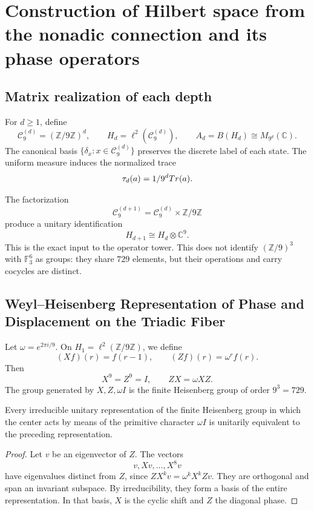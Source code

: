 \label{chap:83-21}



\section{Construction of Hilbert space from the nonadic connection and its phase operators}

\subsection{Matrix realization of each depth}

For \(d\ge1\), define
\[
  \mathcal C_9^{(d)}=(\mathbb Z/9\mathbb Z)^d,
  \qquad
  H_d=\ell^2(\mathcal C_9^{(d)}),
  \qquad
  A_d=B(H_d)\cong M_{9^d}(\mathbb C).
\]
The canonical basis \(\{\delta_x:x\in\mathcal C_9^{(d)}\}\) preserves the
discrete label of each state. The uniform measure induces the normalized
trace
\[
  \tau_d(a)=1/9^dTr(a).
\]

The factorization
\[
  \mathcal C_9^{(d+1)}
  =
  \mathcal C_9^{(d)}\times\mathbb Z/9\mathbb Z
\]
produce a unitary identification
\[
  H_{d+1}\cong H_d\otimes\mathbb C^9.
\]
This is the exact input to the operator tower. This does not identify
\((\mathbb Z/9)^3\) with \(\mathbb F_3^6\) as groups: they share \(729\)
elements, but their operations and carry cocycles are distinct.

\subsection{Weyl–Heisenberg Representation of Phase and Displacement on the Triadic Fiber}

Let \(\omega=e^{2\pi i/9}\). On
\(H_1=\ell^2(\mathbb Z/9\mathbb Z)\), we define
\[
  (Xf)(r)=f(r-1),
  \qquad
  (Zf)(r)=\omega^r f(r).
\]
Then
\[
  X^9=Z^9=I,
  \qquad
  ZX=\omega XZ.
\]
The group generated by \(X,Z,\omega I\) is the finite Heisenberg group of
order \(9^3=729\).

\begin{theorem}
Every irreducible unitary representation of the finite Heisenberg group in
which the center acts by means of the primitive character
\(\omega I\) is unitarily equivalent to the preceding representation.
\end{theorem}

\begin{proof}
Let \(v\) be an eigenvector of \(Z\). The vectors
\[
  v,Xv,\ldots,X^8v
\]
have eigenvalues distinct from \(Z\), since
\(ZX^kv=\omega^kX^kZv\). They are orthogonal and span an invariant
subspace. By irreducibility, they form a basis of the entire representation.
In that basis, \(X\) is the cyclic shift and \(Z\) the diagonal phase.
\end{proof}

